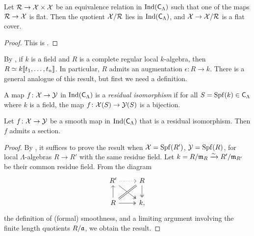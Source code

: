 \documentclass[phd,cornellheadings,draft]{cornell}
\begin{document}
\begin{theorem}\label{thm:quotients-ind}
Let $\mathcal{R}\to \mathcal{X}\times \mathcal{X}$ be an equivalence relation in 
$\operatorname{Ind}(\mathsf{C}_\Lambda)$ such that one of the maps $\mathcal{R}\to \mathcal{X}$ is 
flat. Then the quotient $\mathcal{X}/\mathcal{R}$ lies in $\operatorname{Ind}(\mathsf{C}_\Lambda)$, and 
$\mathcal{X}\to \mathcal{X}/\mathcal{R}$ is a flat cover. 
\end{theorem}
\begin{proof}
This is \cite[VII\textsubscript{B} 1.4]{sga3-1}. 
\end{proof}

By \cite[29.7]{matsumura-1989}, if $k$ is a field and $R$ is a complete regular 
local $k$-algebra, then $R\simeq k\llbracket t_1,\dots,t_n \rrbracket$. In particular, $R$ 
admits an augmentation $\epsilon\colon R\to k$. There is a general analogue of 
this result, but first we need a definition. 

\begin{definition}
A map $f\colon \mathcal{X}\to \mathcal{Y}$ in $\operatorname{Ind}(\mathsf{C}_\Lambda)$ is a 
\emph{residual isomorphism} if for all $S=\operatorname{Spf}(k)\in \mathsf{C}_\Lambda$ where 
$k$ is a field, the map $f\colon \mathcal{X}(S)\to \mathcal{Y}(S)$ is a bijection. 
\end{definition}

\begin{lemma}\label{thm:smooth-section}
Let $f\colon \mathcal{X}\to \mathcal{Y}$ be a smooth map in $\operatorname{Ind}(\mathsf{C}_\Lambda)$ 
that is a residual isomorphism. Then $f$ admits a section. 
\end{lemma}
\begin{proof}
By \cite[VII\textsubscript{B} 0.1.1]{sga3-1}, it suffices to prove the result 
when $\mathcal{X}=\operatorname{Spf}(R')$, $\mathcal{Y}=\operatorname{Spf}(R)$, for local $\Lambda$-algebras $R\to R'$ 
with the same residue field. Let $k=R/\mathfrak{m}_R \xrightarrow\sim R'/\mathfrak{m}_{R'}$ be their common 
residue field. From the diagram 
\[
\begin{tikzcd}
	R' \ar[r, dotted] \ar[dr, two heads]
		& R \ar[d, two heads] \\
	R \ar[u] \ar[ur, equal] \ar[r, two heads]
		& k ,
\end{tikzcd}
\]
the definition of (formal) smoothness, and a limiting argument involving the 
finite length quotients $R/\mathfrak{a}$, we obtain the result. 
\end{proof}
\end{document}
